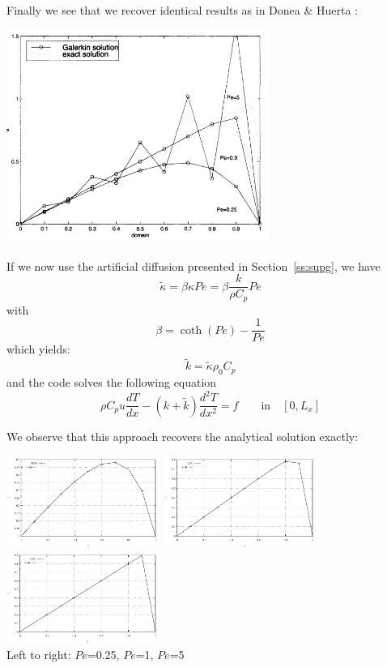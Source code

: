 Finally we see that we recover identical results as in Donea \& Huerta \cite{dohu03}:

\begin{center}
\includegraphics[width=8.6cm]{python_codes/fieldstone_65/images/dohu}
\end{center}

If we now use the artificial diffusion presented in Section~\ref{ss:supg}, we have
\[
\tilde{\kappa}=\beta \kappa Pe = \beta \frac{k}{\rho C_p} Pe
\]
with 
\[
\beta=\coth(Pe)-\frac{1}{Pe}
\]
which yields:
\[
\tilde{k} = \tilde{\kappa} \rho_0 C_p 
\]
and the code solves the following equation
\begin{equation}
\rho C_p u \frac{dT}{dx} - (k + \tilde{k})\frac{d^2T}{dx^2} = f \qquad \text{in} \quad [0,L_x]
\end{equation}


We observe that this approach recovers the analytical solution exactly:
\begin{center}
\includegraphics[width=5cm]{python_codes/fieldstone_65/results/artdiff/T1.pdf}
\includegraphics[width=5cm]{python_codes/fieldstone_65/results/artdiff/T2.pdf}
\includegraphics[width=5cm]{python_codes/fieldstone_65/results/artdiff/T3.pdf}\\
{\captionfont Left to right: $Pe$=0.25, $Pe$=1, $Pe$=5}
\end{center}

